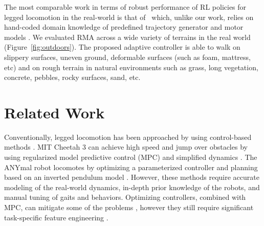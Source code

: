 \documentclass[conference]{IEEEtran}
\newcommand{\aravind}[1]{{\color{blue} {Aravind: {#1}}}}
\begin{document}
The most comparable work in terms of robust performance of RL policies for legged locomotion in the real-world is that of~\citet{lee2020learning} which, unlike our work, relies on hand-coded domain knowledge of predefined trajectory generator \cite{iscen2018policies} and motor models \cite{hwangbo2019learning}. We evaluated RMA across a wide variety of terrains in the real world (Figure~\ref{fig:outdoors}). The proposed adaptive controller is able to walk on slippery surfaces, uneven ground, deformable surfaces (such as foam, mattress, etc) and on rough terrain in natural environments such as grass, long vegetation, concrete, pebbles, rocky surfaces, sand, etc.  


\section{Related Work}
\label{sec:related}
Conventionally, legged locomotion has been approached by using control-based methods \cite{miura1984dynamic,raibert1984hopping,geyer2003positive,yin2007simbicon,sreenath2011compliant,johnson2012tail,khoramshahi2013piecewise,ames2014rapidly,hyun2016implementation,barragan2018minirhex}. MIT Cheetah 3 \cite{bledt2018cheetah} can achieve high speed and jump over obstacles by using regularized model predictive control (MPC) and simplified dynamics \cite{di2018dynamic}. The ANYmal robot \cite{hutter2016anymal} locomotes by optimizing a parameterized controller and planning based on an inverted pendulum model \cite{gehring2016practice}. However, these methods require accurate modeling of the real-world dynamics, in-depth prior knowledge of the robots, and manual tuning of gaits and behaviors. Optimizing controllers, combined with MPC, can mitigate some of the problems \cite{kober2013reinforcement,calandra2016bayesian,choromanski2018optimizing}, however they still require significant task-specific feature engineering \cite{de2010feature,gehring2016practice,apgar2018fast}. 
\end{document}

